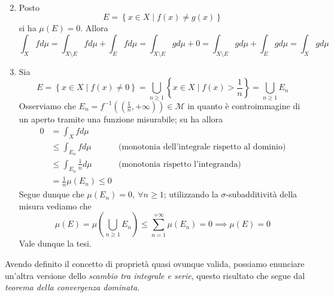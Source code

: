 \begin{demonstration}~{}
	\begin{enumerate}[label=\Roman*]
		\setcounter{enumi}{1}
		\item Posto
		\begin{equation*}
			E=\left\{x\in X\mid f(x)\neq g(x)\right\}
		\end{equation*}
	si ha $\mu\left(E\right)=0$. Allora
	\begin{equation*}
		\int_Xfd\mu=\int_{X\setminus E}fd\mu+\int_Efd\mu=\int_{X\setminus E}gd\mu+0=\int_{X\setminus E}gd\mu+\int_Egd\mu=\int_Xgd\mu
	\end{equation*}
	\item Sia
		\begin{equation*}
			E=\left\{x\in X\mid f(x)\neq 0\right\}=\bigcup_{n\geq 1}\left\{x\in X\mid f(x)>\frac{1}{n}\right\}=\bigcup_{n\geq 1}E_n
		\end{equation*}
	Osserviamo che $E_n=f^{-1}\left(\left(\frac{1}{n},+\infty\right)\right)\in\mathcal{M}$ in quanto è controimmagine di un aperto tramite una funzione misurabile; su ha allora
	\begin{align*}
		0&=\int_Xfd\mu&\\
		 &\leq\int_{E_n}fd\mu&\text{(monotonia dell'integrale rispetto al dominio)}\\
		 &\leq\int_{E_n}\frac{1}{n}d\mu&\text{(monotonia rispetto l'integranda)}\\
		 &=\frac{1}{n}\mu\left(E_n\right)\leq 0&
	\end{align*}
	Segue dunque che $\mu\left(E_n\right)=0,\ \forall n\geq 1$; utilizzando la $\sigma$-subadditività della misura vediamo che
	\begin{equation*}
		\mu\left(E\right)=\mu\left(\bigcup_{n\geq 1}E_n\right)\leq\sum_{n=1}^{+\infty}\mu\left(E_n\right)=0\implies \mu\left(E\right)=0
	\end{equation*}
	Vale dunque la tesi.\qedhere
	\end{enumerate}
\end{demonstration}
Avendo definito il concetto di proprietà quasi ovunque valida, possiamo enunciare un'altra versione dello \textit{scambio tra integrale e serie}, questo risultato che segue dal \textit{teorema della convergenza dominata}.
